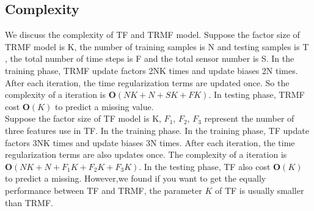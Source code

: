 \subsection{Complexity}
We discuss the complexity of TF and TRMF model. Suppose the factor size of TRMF model is K, the number of training samples is N and testing samples is T , the total number of time steps is F and the total sensor number is S. In the training phase, TRMF update factors 2NK times and update biases 2N times. After each iteration, the time regularization terms are updated once. So the complexity of a iteration is $\mathbf{O}(NK+N+SK+FK)$. In testing phase, TRMF cost  
$\mathbf{O}(K)$ to predict a missing value.\\
Suppose the factor size of TF model is K, $F_1$, $F_2$, $F_3$ represent the number of three features use in TF. In the training phase. In the training phase, TF update factors 3NK times and update biases 3N times. After each iteration, the time regularization terms are also updates once. The complexity of a iteration is $\mathbf{O}(NK+N+F_1K+F_2K+F_3K)$. In the testing phase, TF also cost  $\mathbf{O}(K)$ to predict a missing. However,we found if you want to get the equally performance between TF and TRMF, the parameter $K$ of TF is usually smaller than TRMF.



